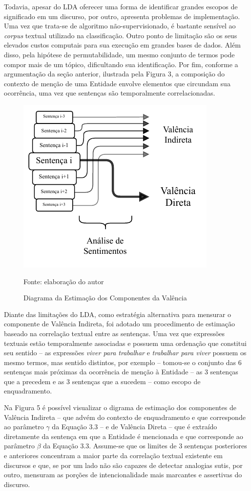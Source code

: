 \documentclass[
12pt,				%
openright,			%
twoside,			%
a4paper,			%
english,			%
french,				%
spanish,			%
brazil				%
]{abntex2}
\begin{document}
Todavia, apesar do LDA oferecer uma forma de identificar grandes escopos de significado em um discurso, por outro, apresenta problemas de implementação. Uma vez que trata-se de algoritmo não-supervisionado, é bastante sensível ao \emph{corpus} textual utilizado na classificação. Outro ponto de limitação são os seus elevados custos computais para sua execução em grandes bases de dados. Além disso, pela hipótese de permutabilidade, um mesmo conjunto de termos pode compor mais de um tópico, dificultando sua identificação. Por fim, conforme a argumentação da seção anterior, ilustrada pela Figura 3, a composição do contexto de menção de uma Entidade envolve elementos que circundam sua ocorrência, uma vez que sentenças são temporalmente correlacionadas. 
 
\begin{figure}[h]
	\caption{Diagrama da Estimação dos Componentes da Valência}
	\label{fig:diagram_op}
	\centering
	\includegraphics[width=0.5\linewidth]{figures/estimacao_valencia}
	
	Fonte: elaboração do autor
\end{figure}
 
Diante das limitações do LDA, como estratégia alternativa para mensurar o componente de Valência Indireta, foi adotado um procedimento de estimação baseado na correlação textual entre as sentenças. Uma vez que expressões textuais estão temporalmente associadas e possuem uma ordenação que constitui seu sentido -- as expressões \textit{viver para trabalhar} e \textit{trabalhar para viver} possuem os mesmo termos, mas sentido distintos, por exemplo -- tomou-se o conjunto das 6 sentenças mais próximas da ocorrência de menção à Entidade -- as 3 sentenças que a precedem e as 3 sentenças que a sucedem -- como escopo de enquadramento. 

Na Figura 5 é possível visualizar o digrama de estimação dos componentes de Valência Indireta -- que advém do contexto de enquadramento e que corresponde ao parâmetro $\gamma$ da Equação 3.3 -- e de Valência Direta -- que é extraído diretamente da sentença em que a Entidade é mencionada e que corresponde ao parâmetro $\beta$ da Equação 3.3. Assume-se que os limites de 3 sentenças posteriores e anteriores concentram a maior parte da correlação textual existente em discursos e que, se por um lado não são capazes de detectar analogias sutis, por outro, mensuram as porções de intencionalidade mais marcantes e assertivas do discurso.
 
\end{document}
